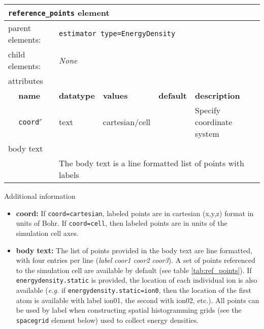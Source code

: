 \FloatBarrier
\begin{table}[h]
\begin{center}
\begin{tabularx}{\textwidth}{l l l l l l }
\hline
\multicolumn{6}{l}{\texttt{reference\_points} element} \\
\hline
\multicolumn{2}{l}{parent elements:} & \multicolumn{4}{l}{\texttt{estimator type=EnergyDensity}}\\
\multicolumn{2}{l}{child  elements:} & \multicolumn{4}{l}{\textit{None}}\\
\multicolumn{2}{l}{attributes}  & \multicolumn{4}{l}{}\\
   &   \bfseries name     & \bfseries datatype & \bfseries values & \bfseries default   & \bfseries description \\
   &   \texttt{coord}$^r$ &  text              & cartesian/cell   &                     & Specify coordinate system \\
\multicolumn{2}{l}{body text}  & \multicolumn{4}{l}{}\\
   &                           & \multicolumn{4}{l}{The body text is a line formatted list of points with labels}     \\
  \hline
\end{tabularx}
\end{center}
\end{table}
\FloatBarrier

Additional information
\begin{itemize}
  \item{\textbf{coord:} If \texttt{coord=cartesian}, labeled points are in cartesian (x,y,z) format in units of Bohr.  If \texttt{coord=cell}, then labeled points are in units of the simulation cell axes.}
  \item{\textbf{body text:}  The list of points provided in the body text are line formatted, with four entries per line (\textit{label} \textit{coor1} \textit{coor2} \textit{coor3}}).  A set of points referenced to the simulation cell are available by default (see table \ref{tab:ref_points}).  If \texttt{energydensity.static} is provided, the location of each individual ion is also available (\textit{e.g.} if \texttt{energydensity.static=ion0}, then the location of the first atom is available with label ion01, the second with ion02, etc.). All points can be used by label when constructing spatial histogramming grids (see the \texttt{spacegrid} element below) used to collect energy densities.    
\end{itemize}


